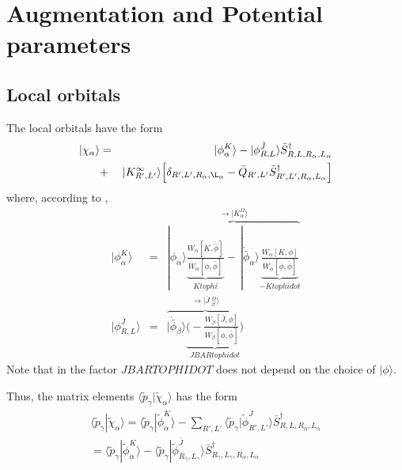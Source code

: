 \documentclass[11pt,a4paper]{report}
\begin{document}
\section{Augmentation and Potential parameters}
\subsection{Local orbitals}
The local orbitals have the form
\begin{eqnarray}
|\chi_\alpha\rangle&=&|\phi^K_\alpha\rangle
- |\phi^{\bar{J}}_{R,L}\rangle \bar{S}^\dagger_{R,L,R_\alpha,L_\alpha}
\nonumber\\
&+&|K^\infty_{R',L'}\rangle\Bigl[ \delta_{R',L',R_\alpha,\L_\alpha}-\bar{Q}_{R',L'}
\bar{S}^\dagger_{R',L',R_\alpha,L_\alpha}\Bigr]
\end{eqnarray}
where, according to ,
\begin{eqnarray}
|\phi^K_\alpha\rangle&=&
\overbrace{
|\phi_\alpha\rangle 
\underbrace{
\frac{W_\alpha[K,\dot{\bar{\phi}}]}{W_\alpha[\phi,\dot{\bar{\phi}}]}}_{Ktophi}
-\,|\dot{\bar{\phi}}_\alpha\rangle 
\underbrace{\frac{W_\alpha[K,\phi]}{W_\alpha[\phi,\dot{\bar{\phi}}]}}_{-Ktophidot}
}^{\rightarrow |K^\Omega_\alpha\rangle}
\nonumber\\
|\phi^{\bar{J}}_{R,L}\rangle
&=&\overbrace{
|\dot{\bar{\phi}}_\beta\rangle 
\underbrace{\biggl(-\frac{W_\beta[\bar{J},\phi]}{W_\beta[\phi,\dot{\bar{\phi}}]}\biggr)}_{JBARtophidot}
}^{\rightarrow |\bar{J}\;^\Omega_\beta\rangle}
\end{eqnarray}
Note that in the factor $JBARTOPHIDOT$ does not depend on the choice
of $|\phi\rangle$.

Thus, the matrix elements
$\langle\tilde{p}_\gamma|\tilde{\chi}_\alpha\rangle$ has the form
\begin{eqnarray}
\langle\tilde{p}_\gamma|\tilde{\chi}_\alpha\rangle
=\langle\tilde{p}_\gamma|\tilde{\phi}^K_\alpha\rangle
-\sum_{R',L'}\langle\tilde{p}_\gamma|\tilde{\phi}^{\bar{J}}_{R',L'}\rangle
\bar{S}^\dagger_{R,L,R_\alpha,L_\alpha}
\nonumber\\
=\langle\tilde{p}_\gamma|\tilde{\phi}^K_\alpha\rangle
-\langle\tilde{p}_\gamma|\tilde{\phi}^{\bar{J}}_{R_\gamma,L_\gamma}\rangle
\bar{S}^\dagger_{R_\gamma,L_\gamma,R_\alpha,L_\alpha}
\end{eqnarray}
\end{document}
